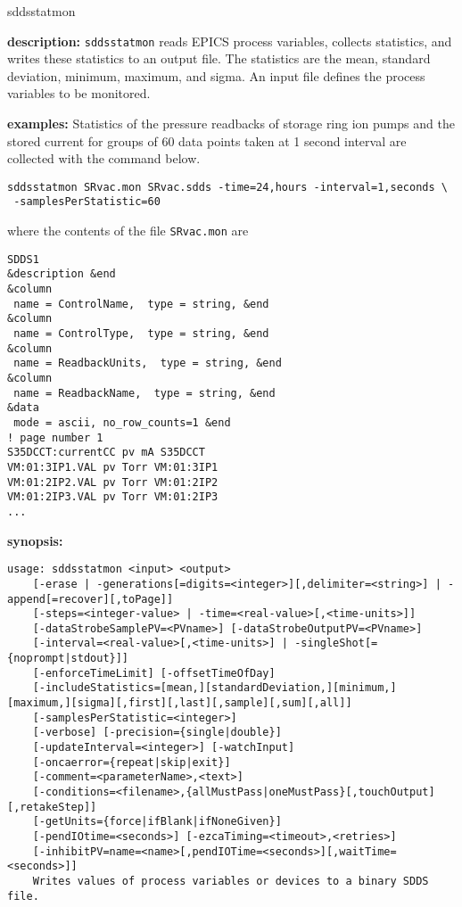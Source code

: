 \begin{sddsprog}{sddsstatmon}
\item \textbf{description:}
\verb+sddsstatmon+ reads EPICS process variables, collects statistics,
and writes these statistics to an output file.
The statistics are the mean, standard deviation, minimum, maximum, and sigma.
An input file defines the process variables to be monitored.
\item \textbf{examples:}
%
Statistics of the pressure readbacks of storage ring ion pumps and the stored current
for groups of 60 data points taken at 1 second interval are collected
with the command below.
\begin{verbatim}
sddsstatmon SRvac.mon SRvac.sdds -time=24,hours -interval=1,seconds \
 -samplesPerStatistic=60
\end{verbatim}
where the contents of the file \verb+SRvac.mon+ are
\begin{verbatim}
SDDS1
&description &end
&column
 name = ControlName,  type = string, &end
&column
 name = ControlType,  type = string, &end
&column
 name = ReadbackUnits,  type = string, &end
&column
 name = ReadbackName,  type = string, &end
&data
 mode = ascii, no_row_counts=1 &end
! page number 1
S35DCCT:currentCC pv mA S35DCCT
VM:01:3IP1.VAL pv Torr VM:01:3IP1
VM:01:2IP2.VAL pv Torr VM:01:2IP2
VM:01:2IP3.VAL pv Torr VM:01:2IP3
...
\end{verbatim}
\item \textbf{synopsis:}
\begin{verbatim}
usage: sddsstatmon <input> <output>
    [-erase | -generations[=digits=<integer>][,delimiter=<string>] | -append[=recover][,toPage]]
    [-steps=<integer-value> | -time=<real-value>[,<time-units>]]
    [-dataStrobeSamplePV=<PVname>] [-dataStrobeOutputPV=<PVname>]
    [-interval=<real-value>[,<time-units>] | -singleShot[={noprompt|stdout}]]
    [-enforceTimeLimit] [-offsetTimeOfDay]
    [-includeStatistics=[mean,][standardDeviation,][minimum,][maximum,][sigma][,first][,last][,sample][,sum][,all]]
    [-samplesPerStatistic=<integer>]
    [-verbose] [-precision={single|double}]
    [-updateInterval=<integer>] [-watchInput]
    [-oncaerror={repeat|skip|exit}]
    [-comment=<parameterName>,<text>]
    [-conditions=<filename>,{allMustPass|oneMustPass}[,touchOutput][,retakeStep]]
    [-getUnits={force|ifBlank|ifNoneGiven}]
    [-pendIOtime=<seconds>] [-ezcaTiming=<timeout>,<retries>]
    [-inhibitPV=name=<name>[,pendIOTime=<seconds>][,waitTime=<seconds>]]
    Writes values of process variables or devices to a binary SDDS file.

\end{verbatim}
\end{sddsprog}
